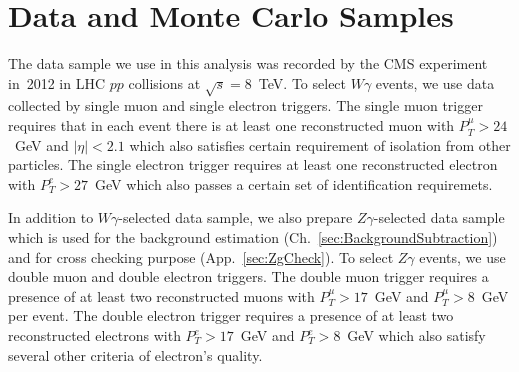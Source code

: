 \section{Data and Monte Carlo Samples}
\label{sec:DataAndMC}

The data sample we use in this analysis was recorded by the CMS experiment in~2012 in LHC $pp$ collisions at $\sqrt{s}=8$~TeV. To select $W\gamma$ events, we use data collected by single muon and single electron triggers. The single muon trigger requires that in each event there is at least one reconstructed muon with $P_T^{\mu}>24$~GeV and $|\eta|<2.1$ which also satisfies certain requirement of isolation from other particles. The single electron trigger requires at least one reconstructed electron with $P_T^{e}>27$~GeV which also passes a certain set of identification requiremets.

In addition to $W\gamma$-selected data sample, we also prepare $Z\gamma$-selected data sample which is used for the background estimation (Ch.~\ref{sec:BackgroundSubtraction}) and for cross checking purpose (App.~\ref{sec:ZgCheck}). To select $Z\gamma$ events, we use double muon and double electron triggers. The double muon trigger requires a presence of at least two reconstructed muons with $P_T^{\mu}>17$~GeV and $P_T^{\mu}>8$~GeV per event. The double electron trigger requires a presence of at least two reconstructed electrons with $P_T^{e}>17$~GeV and $P_T^{e}>8$~GeV which also satisfy several other criteria of electron's quality.






